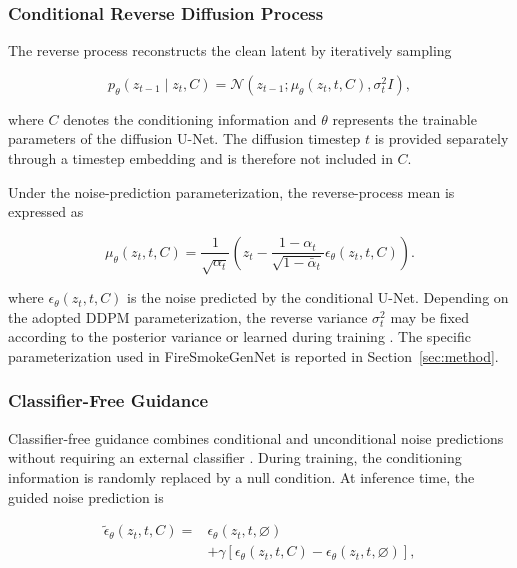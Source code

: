 \documentclass[journal]{IEEEtran}
\begin{document}
\subsubsection{Conditional Reverse Diffusion Process}

The reverse process reconstructs the clean latent by iteratively
sampling

\begin{equation}
p_\theta(z_{t-1}\mid z_t,C)
=
\mathcal{N}
\left(
z_{t-1};
\mu_\theta(z_t,t,C),
\sigma_t^2 I
\right),
\label{eq:reverse}
\end{equation}

where \(C\) denotes the conditioning information and \(\theta\)
represents the trainable parameters of the diffusion U-Net. The
diffusion timestep \(t\) is provided separately through a timestep
embedding and is therefore not included in \(C\).

Under the noise-prediction parameterization, the reverse-process mean
is expressed as

\begin{equation}
\mu_\theta(z_t,t,C)
=
\frac{1}{\sqrt{\alpha_t}}
\left(
z_t-
\frac{1-\alpha_t}{\sqrt{1-\bar{\alpha}_t}}
\epsilon_\theta(z_t,t,C)
\right).
\label{eq:reverse_mean}
\end{equation}

where \(\epsilon_\theta(z_t,t,C)\) is the noise predicted by the
conditional U-Net. Depending on the adopted DDPM parameterization, the
reverse variance \(\sigma_t^2\) may be fixed according to the posterior
variance or learned during training
\cite{nichol2021improveddenoisingdiffusionprobabilistic}. The specific
parameterization used in FireSmokeGenNet is reported in
Section~\ref{sec:method}.


\subsubsection{Classifier-Free Guidance}

Classifier-free guidance combines conditional and unconditional noise
predictions without requiring an external classifier
\cite{ho2022classifierfreediffusionguidance}. During training, the conditioning information
is randomly replaced by a null condition. At inference time, the guided
noise prediction is

\begin{equation}
\begin{aligned}
\widetilde{\epsilon}_{\theta}(z_t,t,C)
={}&
\epsilon_{\theta}(z_t,t,\varnothing) \\
&+
\gamma
\left[
\epsilon_{\theta}(z_t,t,C)
-
\epsilon_{\theta}(z_t,t,\varnothing)
\right],
\end{aligned}
\label{eq:classifier_free_guidance}
\end{equation}
\end{document}
